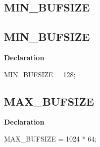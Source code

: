 \documentclass{report}
\newif\ifpdf
\begin{document}
\subsection*{\large{\textbf{MIN{\_}BUFSIZE}}\normalsize\hspace{1ex}\hrulefill}
\else
\subsection*{MIN{\_}BUFSIZE}
\fi
\label{PasDoc_StreamUtils-MIN_BUFSIZE}
\begin{list}{}{
\setlength{\itemindent}{0cm}
\setlength{\listparindent}{0cm}
\setlength{\leftmargin}{\evensidemargin}
\addtolength{\leftmargin}{\tmplength}
\settowidth{\labelsep}{X}
\addtolength{\leftmargin}{\labelsep}
\setlength{\labelwidth}{\tmplength}
}
\item[\textbf{Declaration}\hfill]
\ifpdf
\begin{flushleft}
\fi
\begin{ttfamily}
MIN{\_}BUFSIZE     = 128;\end{ttfamily}

\ifpdf
\end{flushleft}
\fi

\end{list}
\ifpdf
\subsection*{\large{\textbf{MAX{\_}BUFSIZE}}\normalsize\hspace{1ex}\hrulefill}
\else
\subsection*{MAX{\_}BUFSIZE}
\fi
\label{PasDoc_StreamUtils-MAX_BUFSIZE}
\begin{list}{}{
\setlength{\itemindent}{0cm}
\setlength{\listparindent}{0cm}
\setlength{\leftmargin}{\evensidemargin}
\addtolength{\leftmargin}{\tmplength}
\settowidth{\labelsep}{X}
\addtolength{\leftmargin}{\labelsep}
\setlength{\labelwidth}{\tmplength}
}
\item[\textbf{Declaration}\hfill]
\ifpdf
\begin{flushleft}
\fi
\begin{ttfamily}
MAX{\_}BUFSIZE     = 1024 * 64;\end{ttfamily}

\ifpdf
\end{flushleft}
\fi

\end{list}
\end{document}
